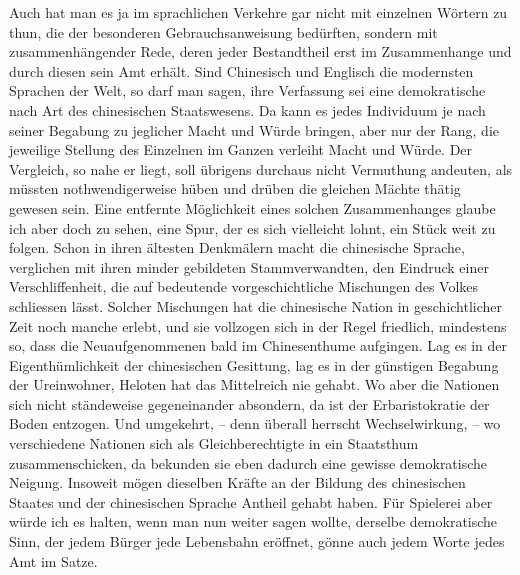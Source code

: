 Auch hat man es ja im sprachlichen Verkehre gar nicht mit einzelnen Wörtern zu thun, die der besonderen Gebrauchsanweisung bedürften, sondern mit zusammenhängender Rede, deren jeder Bestandtheil erst im Zusammenhange und durch diesen sein Amt erhält. Sind Chinesisch und Englisch die modernsten Sprachen der Welt, so darf man sagen, ihre Verfassung sei eine demokratische  nach Art des chinesischen Staatswesens. Da kann es jedes Individuum je nach seiner Begabung zu jeglicher Macht und Würde bringen, aber nur der Rang, die jeweilige Stellung des Einzelnen im Ganzen verleiht Macht und Würde. Der Vergleich, so nahe er liegt, soll übrigens durchaus nicht  Vermuthung andeuten, als müssten nothwendigerweise hüben und drüben die gleichen Mächte thätig gewesen sein. Eine entfernte Möglichkeit eines solchen Zusammenhanges glaube ich aber doch zu sehen, eine Spur, der es sich vielleicht lohnt, ein Stück weit zu folgen. Schon \label{fp.420} in ihren ältesten Denkmälern macht die chinesische Sprache, verglichen mit ihren minder gebildeten Stammverwandten, den Eindruck einer Verschliffenheit, die auf bedeutende vorgeschichtliche Mischungen des Volkes schliessen lässt. Solcher Mischungen hat die chinesische Nation in geschichtlicher Zeit noch manche erlebt, und sie vollzogen sich in der Regel friedlich, mindestens so, dass die Neuaufgenommenen bald im Chinesenthume aufgingen. Lag es in der Eigenthümlichkeit der chinesischen Gesittung, lag es in der günstigen Begabung der Ureinwohner, Heloten hat das Mittelreich nie gehabt. Wo aber die Nationen sich nicht ständeweise gegeneinander absondern, da ist der Erbaristokratie der Boden entzogen. Und umgekehrt, – denn überall herrscht Wechselwirkung, – wo verschiedene Nationen sich als Gleichberechtigte in ein Staatsthum zusammenschicken, da bekunden sie eben dadurch eine gewisse demokratische Neigung. \label{sp.441} Insoweit mögen dieselben Kräfte an der Bildung des chinesischen Staates und der chinesischen Sprache Antheil gehabt haben. Für Spielerei aber würde ich es halten, wenn man nun weiter sagen wollte, derselbe demokratische Sinn, der jedem Bürger jede Lebensbahn eröffnet, gönne auch jedem Worte jedes Amt im Satze.

